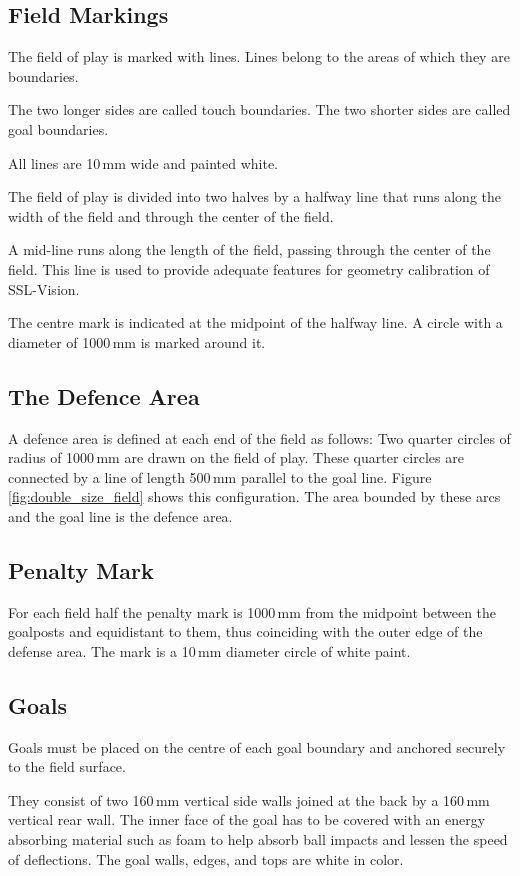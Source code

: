 \subsection{Field Markings}
The field of play is marked with lines.
Lines belong to the areas of which they are boundaries.

The two longer sides are called touch boundaries.
The two shorter sides are called goal boundaries.

All lines are 10\,mm wide and painted white.

The field of play is divided into two halves by a halfway line that runs
along the width of the field and through the center of the field.

A mid-line runs along the length of the field, passing through the center
  of the field. This line is used to provide adequate features for geometry
calibration of SSL-Vision.

The centre mark is indicated at the midpoint of the halfway line.
A circle with a diameter of 1000\,mm is marked around it.

\subsection{The Defence Area}

A defence area is defined at each end of the field as
follows:
Two quarter circles of radius of 1000\,mm
are drawn on the field of play. These quarter circles are connected by a line of
length 500\,mm parallel to the goal line. Figure \ref{fig:double_size_field}
shows this configuration.
The area bounded by these arcs and the goal line is
the defence area.


\subsection{Penalty Mark}
For each field half the penalty mark is
1000\,mm from the midpoint between the goalposts and equidistant to them, thus
coinciding with the outer edge of the defense area.
The mark is a 10\,mm diameter circle of white paint.

\subsection{Goals}
Goals must be placed on the centre of each goal boundary and anchored
securely to the field surface.

They consist of two 160\,mm vertical side walls joined at the back by a 160\,mm
vertical rear wall. The inner face of the goal has to be covered with an energy
absorbing material such as foam to help absorb ball impacts and lessen the speed
of deflections.
The goal walls, edges, and tops are white in color.

